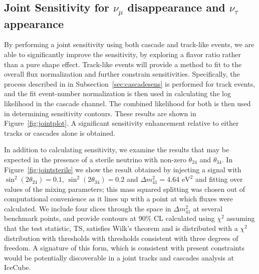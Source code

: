 \documentclass[main.tex]{subfiles}
\begin{document}
\subsection{\label{sec:joint} Joint Sensitivity for $\nu_\mu$ disappearance and $\nu_\tau$ appearance} 

By performing a joint sensitivity using both cascade and track-like events, we are able to significantly improve the sensitivity, by exploring a flavor ratio rather than a pure shape effect. Track-like events will provide a method to fit to the overall flux normalization and further constrain sensitivities. 
Specifically, the process described in in Subsection~\ref{sec:cascadesens} is performed for track events, and the fit event-number normalization is then used in calculating the log likelihood in the cascade channel. The combined likelihood for both is then used in determining sensitivity contours. 
These results are shown in Figure~\ref{fig:jointplot}. A significant sensitivity enhancement relative to either tracks or cascades alone is obtained.

In addition to calculating sensitivity, we examine the results that may be expected in the presence of a sterile neutrino with non-zero $\theta_{24}$ and $\theta_{34}$.  In Figure~\ref{fig:jointsterile} we show the result obtained by injecting a signal with $\sin^2(2\theta_{24})=0.1$, $\sin^2(2\theta_{34})=0.2$ and $\Delta m^2_{41}=4.64\text{ eV}^2$ and fitting over values of the mixing parameters; this mass squared splitting was chosen out of computational convenience as it lines up with a point at which fluxes were calculated.
We include four slices through the space in $\Delta m_{41}^2$ at several benchmark points, and provide contours at 90\% CL calculated using $\chi^2$ assuming that the test statistic, TS, satisfies Wilk's theorem and is distributed with a $\chi^{2}$ distribution with thresholds with thresholds consistent with three degrees of freedom.  A signature of this form, which is consistent with present constraints would be potentially discoverable in a joint tracks and cascades analysis at IceCube.
\end{document}
